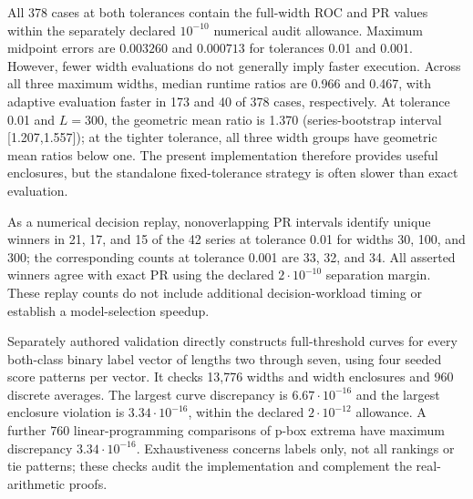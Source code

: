 All 378 cases at both tolerances contain the full-width ROC and PR values
within the separately declared $10^{-10}$ numerical audit allowance.
Maximum midpoint errors are $0.003260$ and $0.000713$ for tolerances 0.01
and 0.001. However, fewer width evaluations do not generally imply faster
execution. Across all three maximum widths, median runtime ratios are
0.966 and 0.467, with adaptive evaluation faster in 173 and 40 of 378 cases,
respectively. At tolerance 0.01 and $L=300$, the geometric mean ratio is
1.370 (series-bootstrap interval [1.207,1.557]); at the tighter tolerance,
all three width groups have geometric mean ratios below one.
The present implementation therefore provides useful enclosures, but the
standalone fixed-tolerance strategy is often slower than exact evaluation.

As a numerical decision replay, nonoverlapping PR intervals identify unique
winners in 21, 17, and 15 of the 42 series at tolerance 0.01 for widths
30, 100, and 300; the corresponding counts at tolerance 0.001 are 33, 32,
and 34. All asserted winners agree with exact PR using the declared
$2\cdot10^{-10}$ separation margin. These replay counts do not include
additional decision-workload timing or establish a model-selection speedup.

Separately authored validation directly constructs full-threshold curves
for every both-class binary label vector of lengths two through seven,
using four seeded score patterns per vector. It checks 13,776 widths and
width enclosures and 960 discrete averages. The largest curve discrepancy
is $6.67\cdot10^{-16}$ and the largest enclosure violation is
$3.34\cdot10^{-16}$, within the declared $2\cdot10^{-12}$ allowance.
A further 760 linear-programming comparisons of p-box extrema have maximum
discrepancy $3.34\cdot10^{-16}$. Exhaustiveness concerns labels only, not all
rankings or tie patterns; these checks audit the implementation and complement
the real-arithmetic proofs.

